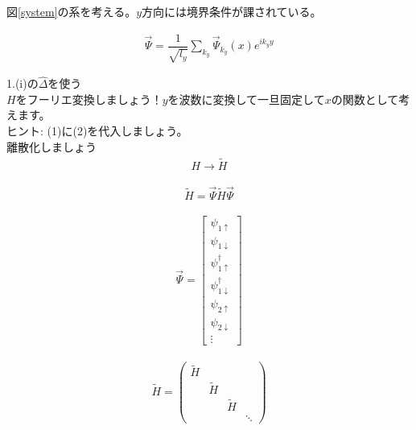 \documentclass{jarticle}
\begin{document}
図\ref{system}の系を考える。$y$方向には境界条件が課されている。

\begin{align}
 \vec{\Psi}=\dfrac{1}{\sqrt{l_y}}\displaystyle\sum_{k_y}\vec{\Psi}_{k_y}(x)e^{ik_yy}
\end{align}

1.(i)の$\hat{\Delta}$を使う\\
$H$をフーリエ変換しましょう！$y$を波数に変換して一旦固定して$x$の関数として考えます。
\\ ヒント: (1)に(2)を代入しましょう。\\
離散化しましょう\\


\begin{align}
 H\rightarrow \tilde{H}
\end{align}

\begin{align}
  \tilde{H}=\vec{\Psi}\tilde{H}\vec{\Psi}
\end{align}

 \begin{align}
  \vec{\Psi}=\begin{bmatrix}
  \psi_{1\uparrow} \\ 
  \psi_{1\downarrow} \\ 
  \psi_{1\uparrow}^\dagger \\ 
  \psi_{1\downarrow}^\dagger\\
  \psi_{2\uparrow} \\ 
  \psi_{2\downarrow} \\ 
  \vdots
 \end{bmatrix}
\end{align}

\begin{align}
\tilde{H}=
\begin{pmatrix}
\tilde{H} &  &  &  \\ 
& \tilde{H} &  &  \\ 
&  & \tilde{H} &  \\ 
&  &  & \ddots
\end{pmatrix} 
\end{align}
\end{document}
